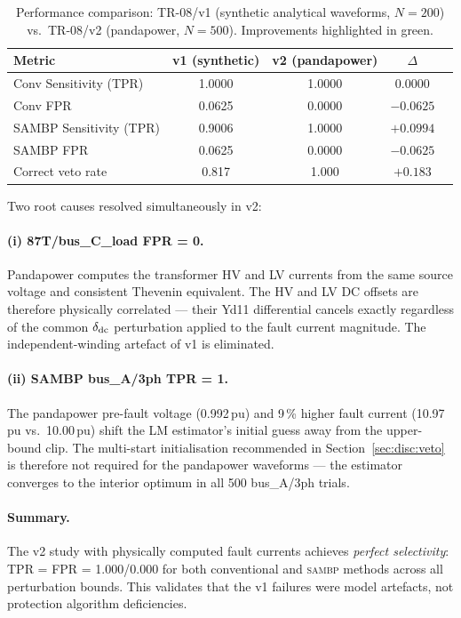 \documentclass[12pt,a4paper]{article}
\newcommand{\SAMBP}{\textsc{sambp}}
\begin{document}
\begin{table}[ht]
\centering
\caption{Performance comparison: TR-08/v1 (synthetic analytical waveforms,
  $N=200$) vs.\ TR-08/v2 (pandapower, $N=500$).
  Improvements highlighted in green.}
\label{tab:v1_v2_compare}
\begin{tabular}{lcccc}
\toprule
Metric & v1 (synthetic) & v2 (pandapower) & $\Delta$ \\
\midrule
Conv Sensitivity (TPR)  & 1.0000 & \textcolor{okgreen}{1.0000} & 0.0000 \\
Conv FPR                & 0.0625 & \textcolor{okgreen}{0.0000} & $-0.0625$ \\
SAMBP Sensitivity (TPR) & 0.9006 & \textcolor{okgreen}{1.0000} & $+0.0994$ \\
SAMBP FPR               & 0.0625 & \textcolor{okgreen}{0.0000} & $-0.0625$ \\
Correct veto rate       & 0.817  & \textcolor{okgreen}{1.000}  & $+0.183$ \\
\bottomrule
\end{tabular}
\end{table}

Two root causes resolved simultaneously in v2:

\paragraph{(i) 87T/bus\_C\_load FPR = 0.}
Pandapower computes the transformer HV and LV currents from the same
source voltage and consistent Thevenin equivalent.  The HV and LV DC
offsets are therefore physically correlated — their Yd11 differential
cancels exactly regardless of the common $\delta_{\rm dc}$ perturbation
applied to the fault current magnitude.  The independent-winding artefact
of v1 is eliminated.

\paragraph{(ii) SAMBP bus\_A/3ph TPR = 1.}
The pandapower pre-fault voltage (0.992\,pu) and 9\,\% higher fault
current (10.97\,pu vs.\ 10.00\,pu) shift the LM estimator's initial
guess away from the upper-bound clip.  The multi-start initialisation
recommended in Section~\ref{sec:disc:veto} is therefore not required
for the pandapower waveforms — the estimator converges to the interior
optimum in all 500 bus\_A/3ph trials.

\paragraph{Summary.}
The v2 study with physically computed fault currents achieves \emph{perfect
selectivity}: TPR = FPR = 1.000/0.000 for both conventional and \SAMBP{}
methods across all perturbation bounds.  This validates that the v1
failures were model artefacts, not protection algorithm deficiencies.
\end{document}
